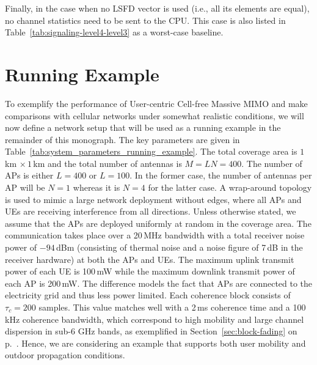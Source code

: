 Finally, in the case when no LSFD vector is used (i.e., all its elements are equal), no channel statistics need to be sent to the CPU. This case is also listed in Table~\ref{tab:signaling-level4-level3} as a worst-case baseline.




\section{Running Example}
\label{sec:running-example}

To exemplify the performance of User-centric Cell-free Massive MIMO and make comparisons with cellular networks under somewhat realistic conditions, we will now define a network setup that will be used as a running example in the remainder of this monograph.
The key parameters are given in Table~\ref{tab:system_parameters_running_example}. The total coverage area is $1$\,km $ \times \, 1$\,km and the total number of antennas is $M=LN=400$. The number of APs is either $L=400$ or $L=100$. In the former case, the number of antennas per AP will be $N=1$ whereas it is $N=4$ for the latter case. A wrap-around topology is used to mimic a large network deployment without edges, where all \glspl{AP} and \glspl{UE} are receiving interference from all directions. Unless otherwise stated, we assume that the APs are deployed uniformly at random in the coverage area. The communication takes place over a 20\,MHz bandwidth with a total receiver noise power of $-94$\,dBm (consisting of thermal noise and a noise figure of 7\,dB in the receiver hardware) at both the APs and UEs. The maximum uplink transmit power of each UE is 100\,mW
while the maximum downlink transmit power of each AP is 200\,mW. The difference models the fact that APs are connected to the electricity grid and thus less power limited.
Each coherence block consists of $\tau_c = 200$ samples. This value matches well with a 2\,ms coherence time and a 100\,kHz coherence bandwidth, which correspond to high mobility and large channel dispersion in sub-6 GHz bands, as exemplified in Section~\ref{sec:block-fading} on p.~\pageref{sec:block-fading}.
Hence, we are considering an example that supports both user mobility and outdoor propagation conditions.


